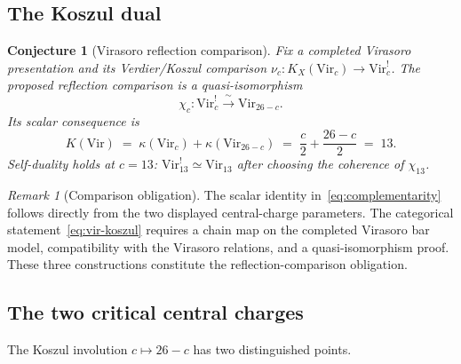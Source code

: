 \documentclass[11pt,reqno]{amsart}
\newtheorem{conjecture}[theorem]{Conjecture}
\theoremstyle{definition}
\theoremstyle{remark}
\newtheorem{remark}[theorem]{Remark}
\begin{document}
\subsection{The Koszul dual}

\begin{conjecture}[Virasoro reflection comparison]
\label{thm:vir-koszul}
Fix a completed Virasoro presentation and its Verdier/Koszul
comparison \(\nu_c\colon K_X(\mathrm{Vir}_c)\to\mathrm{Vir}_c^!\).
The proposed reflection comparison is a quasi-isomorphism
\begin{equation}\label{eq:vir-koszul}
\chi_c\colon \mathrm{Vir}_c^! \xrightarrow{\;\sim\;}
\mathrm{Vir}_{26-c}.
\end{equation}
Its scalar consequence is
\begin{equation}\label{eq:complementarity}
K(\mathrm{Vir}) \;=\;
\kappa(\mathrm{Vir}_c) + \kappa(\mathrm{Vir}_{26-c})
\;=\;
\frac{c}{2} + \frac{26-c}{2}
\;=\; 13.
\end{equation}
Self-duality holds at\/ $c = 13$: $\mathrm{Vir}_{13}^!
\simeq \mathrm{Vir}_{13}$ after choosing the coherence of
\(\chi_{13}\).
\end{conjecture}

\begin{remark}[Comparison obligation]
The scalar identity in~\eqref{eq:complementarity} follows directly
from the two displayed central-charge parameters.  The categorical
statement~\eqref{eq:vir-koszul} requires a chain map on the completed
Virasoro bar model, compatibility with the Virasoro relations, and a
quasi-isomorphism proof.  These three constructions constitute the
reflection-comparison obligation.
\end{remark}

\subsection{The two critical central charges}

The Koszul involution $c \mapsto 26-c$ has two distinguished points.
\end{document}
